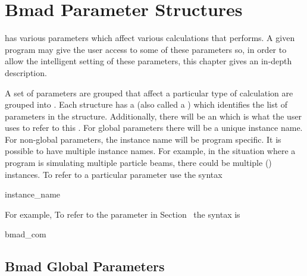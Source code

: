 %

\chapter{Bmad Parameter Structures}

\bmad has various parameters which affect various
calculations that \bmad performs. A given program may give the user
access to some of these parameters so, in order to allow the intelligent
setting of these parameters, this chapter gives an in-depth description.

A set of parameters are grouped that affect a particular type of
calculation are grouped into . Each structure has a
 (also called a ) which
identifies the list of parameters in the structure.  Additionally,
there will be an  which is what the user uses to
refer to this . For global parameters there will be a
unique instance name.  For non-global parameters, the instance name
will be program specific.  It is possible to have multiple instance
names. For example, in the situation where a program is simulating
multiple particle beams, there could be multiple 
() instances.  To refer to a particular parameter
use the syntax
\begin{example}
  instance_name%
\end{example}
For example, To refer to the  parameter in
Section~ the syntax is
\begin{example}
  bmad_com%
\end{example}

\section{Bmad Global Parameters}
\label{s:bmad.params}


